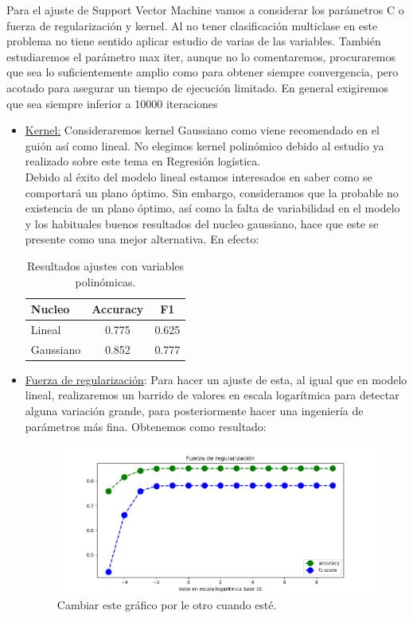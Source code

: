 \documentclass[11pt,a4paper]{article}
\begin{document}
Para el ajuste de Support Vector Machine vamos a considerar los parámetros C o fuerza de regularización y kernel. Al no tener clasificación multiclase en este problema no tiene sentido aplicar estudio de varias de las variables. También estudiaremos el parámetro max iter, aunque no lo comentaremos, procuraremos que sea lo suficientemente amplio como para obtener siempre convergencia, pero acotado para asegurar un tiempo de ejecución limitado. En general exigiremos que sea siempre inferior a 10000 iteraciones
\begin{itemize}
\item \underline{Kernel:} Consideraremos kernel Gaussiano como viene recomendado en el guión así como lineal. No elegimos kernel polinómico debido al estudio ya realizado sobre este tema en Regresión logística.\\

Debido al éxito del modelo lineal estamos interesados en saber como se comportará un plano óptimo. Sin embargo, consideramos que la probable no existencia de un plano
  óptimo, así como la falta de variabilidad en el modelo y los habituales buenos resultados del nucleo gaussiano, hace que este se presente como una mejor alternativa. En efecto:

  
\begin{table}[h]
\begin{center}
\begin{tabular}{|l|c|c|}
\hline
  Nucleo & Accuracy & F1 \\ \hline
Lineal & 0.775 & 0.625 \\
Gaussiano & 0.852 & 0.777  \\\hline
\end{tabular}
\caption{Resultados ajustes con variables polinómicas.}

\end{center}
\end{table}

\item \underline{Fuerza de regularización}: Para hacer un ajuste de esta, al igual que en modelo lineal, realizaremos un barrido de valores en escala logarítmica para detectar alguna variación grande, para posteriormente hacer una ingeniería de parámetros más fina. Obtenemos como resultado:
  \newpage
    \begin{figure}[h!]
      \label{figure:regularization}
      \centering
      \includegraphics[width=\textwidth]{./figures/regularizacion_rl.png}
      \caption{Cambiar este gráfico por le otro cuando esté.}
    \end{figure}
  

\end{itemize}
\end{document}
